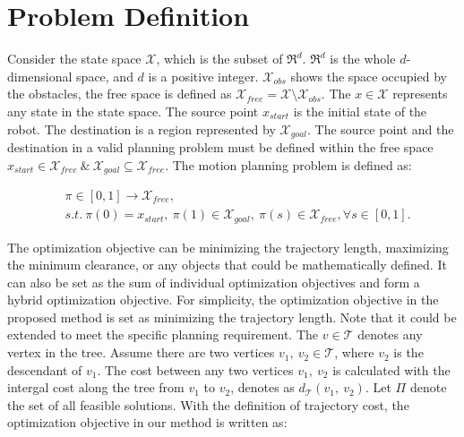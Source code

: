 \section{Problem Definition}

Consider the state space $\mathcal{X}$, which is the subset of $\Re^d$.
$\Re^d$ is the whole $d$-dimensional space, and $d$ is a positive integer.
$\mathcal{X}_{obs}$ shows the space occupied by the obstacles, the free space is defined as $\mathcal{X}_{free} = \mathcal{X} \setminus \mathcal{X}_{obs} $.
The $x \in \mathcal{X}$ represents any state in the state space.
The source point $x_{start}$ is the initial state of the robot.
The destination is a region represented by $\mathcal{X}_{goal}$.
The source point and the destination in a valid planning problem must be defined within the free space $x_{start} \in \mathcal{X}_{free} \ \& \ \mathcal{X}_{goal} \subseteq \mathcal{X}_{free}$.
The motion planning problem is defined as:



\begin{equation}
\begin{aligned}
& \pi \in [0, 1] \to \mathcal{X}_{free}, \\  
& s.t. \ \pi(0) = x_{start}, \ \pi(1) \in \mathcal{X}_{goal}, \ 
\pi(s) \in \mathcal{X}_{free},
\forall s \in [0, 1] .
\label{MotionPlanningDefinition}
\end{aligned}
\end{equation}


The optimization objective can be minimizing the trajectory length, maximizing the minimum clearance, or any objects that could be mathematically defined. 
It can also be set as the sum of individual optimization objectives and form a hybrid optimization objective.
For simplicity, the optimization objective in the proposed method is set as minimizing the trajectory length.
Note that it could be extended to meet the specific planning requirement.
The $v \in \mathcal{T}$ denotes any vertex in the tree.
Assume there are two vertices $v_1, \ v_2 \in \mathcal{T}$, where $v_2$ is the descendant of $v_1$.
The cost between any two vertices $v_1, \ v_2$ is calculated with the intergal cost along the tree from $v_1$ to $v_2$, denotes as $d_{\mathcal{T}}(v_1, \ v_2)$.
Let $\Pi$ denote the set of all feasible solutions.
With the definition of trajectory cost, the optimization objective in our method is written as:


